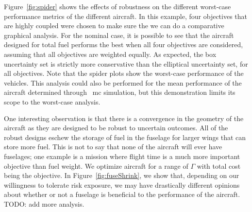 Figure~\ref{fig:spider} shows the effects of robustness on
the different worst-case performance metrics of the different aircraft. In this example, four objectives that
are highly coupled were chosen to make sure the we can do a comparative graphical analysis.
For the nominal case, it is possible to see that
the aircraft designed for total fuel performs the best when all four objectives are considered,
assuming that all objectives are weighted equally. As expected,
the box uncertainty set is strictly more conservative than the elliptical uncertainty set, for
all objectives. Note that the spider plots show the worst-case performance of the vehicles.
This analysis could also be performed for the mean performance
of the aircraft determined through ~\gls{mc} simulation, but this demonstration limits
its scope to the worst-case analysis.

One interesting observation is that there is a convergence in the geometry of the aircraft as they are designed
to be robust to uncertain outcomes. All of the robust designs eschew the storage of fuel in the fuselage
for larger wings that can store more fuel. This is not to say that none of the aircraft will ever have
fuselages; one example is a mission where flight time is a much more important objective
than fuel weight. We optimize aircraft for a range of $\Gamma$ with total cost
being the objective. In Figure~\ref{fig:fuseShrink}, we show that,
depending on our willingness to tolerate risk exposure, we
may have drastically different opinions about whether or not a fuselage is beneficial
to the performance of the aircraft. TODO: add more analysis.

